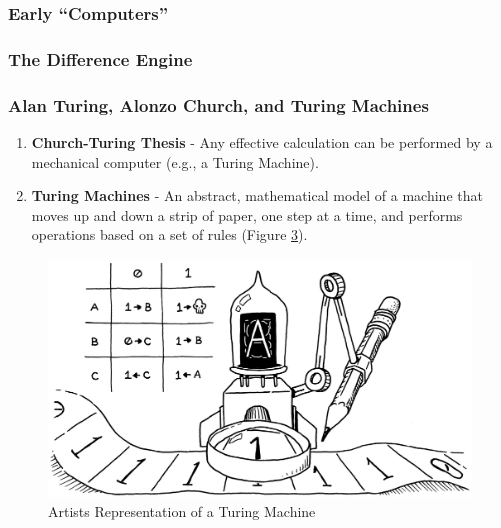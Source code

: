 \documentclass{beamer}
\begin{document}
%
%
\begin{frame}
  \frametitle{Early ``Computers''}
  \begin{minipage}{0.59\textwidth}
  \end{minipage}
  \begin{minipage}{0.39\textwidth}
  \end{minipage}
\end{frame}

%
%
\begin{frame}
  \frametitle{The Difference Engine}
  \begin{minipage}{0.59\textwidth}
  \end{minipage}
  \begin{minipage}{0.39\textwidth}
    \begin{figure}
      \label{fig:analyticalengine.png}
    \end{figure}
    \begin{figure}
      \label{fig:adababage.png}
    \end{figure}
  \end{minipage}
\end{frame}

%
%
\begin{frame}
  \frametitle{Alan Turing, Alonzo Church, and Turing Machines}
  \begin{minipage}{0.59\textwidth}
    \begin{enumerate}
      \item \textbf{Church-Turing Thesis} - Any effective calculation can be performed by a mechanical computer (e.g., a Turing Machine).
      \item \textbf{Turing Machines} - An abstract, mathematical model of a machine that moves up and down a strip of paper, one step at a time, and performs operations based on a set of rules (Figure \ref{fig:turingmachine}).
    \end{enumerate}
  \end{minipage}
  \begin{minipage}{0.39\textwidth}
    \begin{figure}
      \includegraphics[width=\textwidth]{imgs/turing-machine.png}
      \caption{Artists Representation of a Turing Machine}
      \label{fig:turingmachine}
    \end{figure}
  \end{minipage}
\end{frame}
\end{document}
